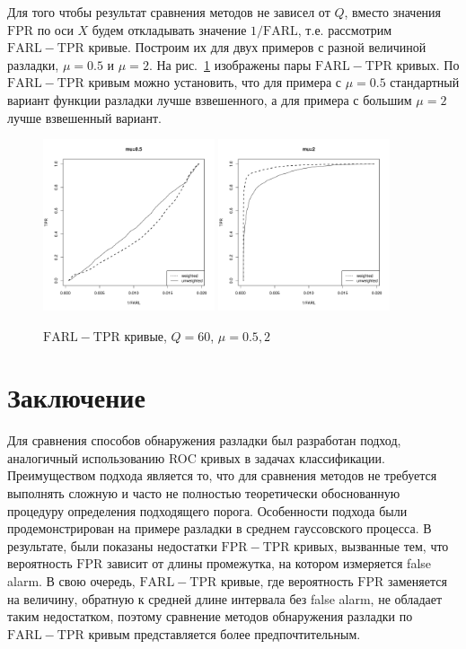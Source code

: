 \documentclass{math-mech-sci}
\newcommand{\FPR}{\mathrm{FPR}}
\newcommand{\TPR}{\mathrm{TPR}}
\newcommand{\FARL}{\mathrm{FARL}}
\begin{document}
Для того чтобы результат сравнения методов не зависел от $Q$, вместо значения $\FPR$ по оси $X$ будем откладывать значение $1/\FARL$, т.е. рассмотрим $\FARL-\TPR$ кривые. Построим их для двух примеров с разной величиной разладки, $\mu=0.5$ и $\mu =2$. На рис.~\ref{fig:arl} изображены пары $\FARL-\TPR$ кривых. По $\FARL-\TPR$ кривым можно установить, что для примера с $\mu=0.5$ стандартный вариант функции разладки лучше взвешенного, а для примера с большим $\mu=2$ лучше взвешенный вариант.

\begin{figure}
	\includegraphics[width=0.45\textwidth]{arl_0.5}
	\includegraphics[width=0.45\textwidth]{arl_2}\caption{$\mathrm{FARL}-\mathrm{TPR}$ кривые, $Q=60$, $\mu=0.5,2$}\label{fig:arl}
\end{figure}

\section{Заключение}
	Для сравнения способов обнаружения разладки был разработан
подход, аналогичный использованию ROC кривых в
задачах классификации. Преимуществом подхода является то, что для сравнения методов не требуется выполнять сложную и часто не полностью теоретически обоснованную процедуру определения подходящего порога. Особенности подхода были продемонстрирован на примере разладки в среднем гауссовского процесса. В результате, были показаны недостатки $\FPR-\TPR$ кривых, вызванные тем, что вероятность $\FPR$ зависит от длины промежутка, на котором измеряется false alarm.  В свою очередь, $\FARL-\TPR$ кривые, где вероятность $\FPR$ заменяется на величину, обратную к средней длине интервала без false alarm, не обладает таким недостатком, поэтому сравнение методов обнаружения разладки по $\FARL-\TPR$ кривым представляется более предпочтительным.
\end{document}
